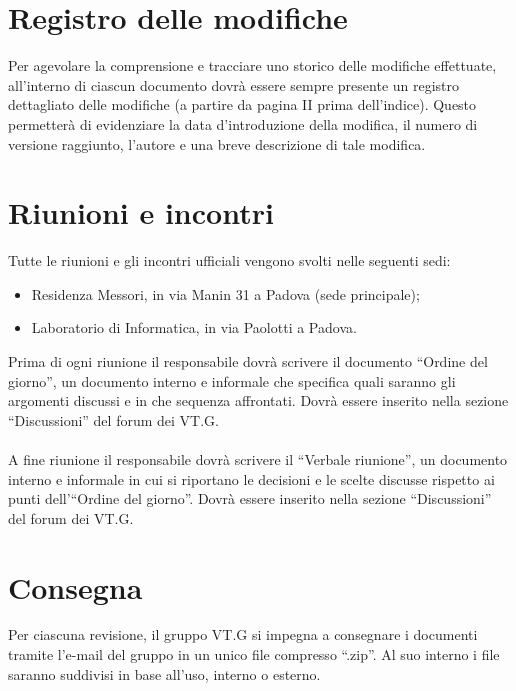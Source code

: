 \chapter{Registro delle modifiche}
\thispagestyle{fancy}
Per agevolare la comprensione e tracciare uno storico delle modifiche
effettuate, all'interno di ciascun documento dovr\`a essere sempre
presente un registro dettagliato delle modifiche (a partire da
pagina II prima dell'indice). Questo permetter\`a di evidenziare la data
d'introduzione della modifica, il numero di versione raggiunto, l'autore e una
breve descrizione di tale modifica.


\chapter{Riunioni e incontri}
\thispagestyle{fancy}
Tutte le riunioni e gli incontri ufficiali vengono svolti nelle seguenti sedi:

\begin{itemize}
\item Residenza Messori, in via Manin 31 a Padova (sede principale);
\item Laboratorio di Informatica, in via Paolotti a Padova.
\end{itemize}

Prima di ogni riunione il responsabile dovr\`a scrivere il documento
``Ordine del giorno'', un documento interno e informale che specifica quali saranno gli
argomenti discussi e in che sequenza affrontati. Dovr\`a essere inserito nella
sezione ``Discussioni'' del forum dei VT.G. \\ \\
A fine riunione il responsabile dovr\`a scrivere il ``Verbale riunione'', un
documento interno e informale in cui si riportano le decisioni e le scelte
discusse rispetto ai punti dell'``Ordine del giorno''. Dovr\`a essere inserito
nella sezione ``Discussioni'' del forum dei VT.G.

\chapter{Consegna}
\thispagestyle{fancy}
Per ciascuna revisione, il gruppo VT.G si impegna a consegnare i documenti
tramite l'e-mail del gruppo in un unico file compresso ``.zip''. Al suo interno i
file saranno suddivisi in base all'uso, interno o esterno.

\listoftables
{}
\listoffigures
{}
